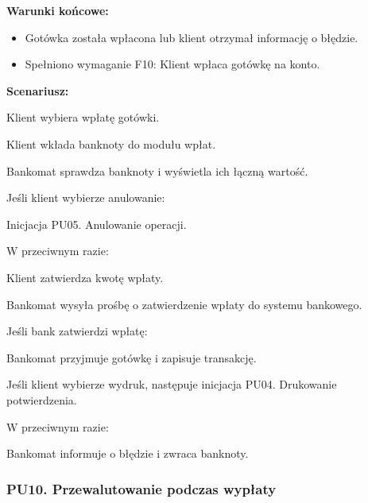 \documentclass[10pt,a4paper]{article}
\begin{document}
\noindent\textbf{Warunki końcowe:}
\begin{itemize}
    \item Gotówka została wpłacona lub klient otrzymał informację o błędzie.
    \item Spełniono wymaganie F10: Klient wpłaca gotówkę na konto.
\end{itemize}

\noindent\textbf{Scenariusz:}
\begin{scenariusz}
    \item Klient wybiera wpłatę gotówki.
    \item Klient wkłada banknoty do modułu wpłat.
    \item Bankomat sprawdza banknoty i wyświetla ich łączną wartość.
    \item Jeśli klient wybierze anulowanie:
    \begin{scenariusz}
        \item Inicjacja PU05. Anulowanie operacji.
    \end{scenariusz}
    \item W przeciwnym razie:
    \begin{scenariusz}
        \item Klient zatwierdza kwotę wpłaty.
        \item Bankomat wysyła prośbę o zatwierdzenie wpłaty do systemu bankowego.
        \item Jeśli bank zatwierdzi wpłatę:
        \begin{scenariusz}
            \item Bankomat przyjmuje gotówkę i zapisuje transakcję.
            \item Jeśli klient wybierze wydruk, następuje inicjacja PU04. Drukowanie potwierdzenia.
        \end{scenariusz}
        \item W przeciwnym razie:
        \begin{scenariusz}
            \item Bankomat informuje o błędzie i zwraca banknoty.
        \end{scenariusz}
    \end{scenariusz}
\end{scenariusz}


\subsubsection*{PU10. Przewalutowanie podczas wypłaty}
\end{document}

